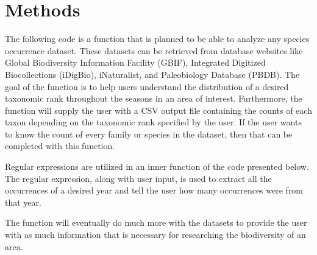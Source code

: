 \documentclass[letterpaper]{article}
\begin{document}
\section{Methods}

The following code is a function that is planned to be able to analyze any species occurrence dataset. These datasets can be retrieved from database websites like Global Biodiversity Information Facility (GBIF), Integrated Digitized Biocollections (iDigBio), iNaturalist, and Paleobiology Database (PBDB). The goal of the function is to help users understand the distribution of a desired taxonomic rank throughout the seasons in an area of interest. Furthermore, the function will supply the user with a CSV output file containing the counts of each taxon depending on the taxonomic rank specified by the user. If the user wants to know the count of every family or species in the dataset, then that can be completed with this function.

Regular expressions are utilized in an inner function of the code presented below. The regular expression, along with user input, is used to extract all the occurrences of a desired year and tell the user how many occurrences were from that year.

The function will eventually do much more with the datasets to provide the user with as much information that is necessary for researching the biodiversity of an area.
\end{document}
